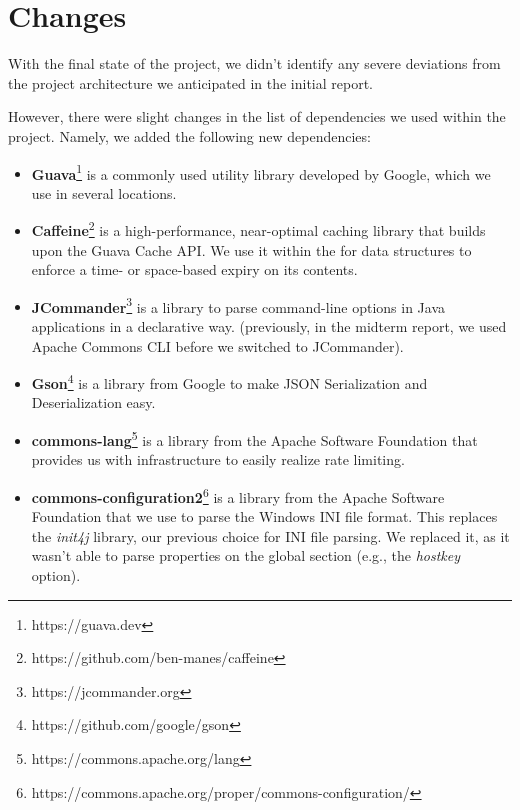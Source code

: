 \section{Changes}\label{sec:objective}

With the final state of the project, we didn't identify any severe deviations from the project architecture
we anticipated in the initial report.

However, there were slight changes in the list of dependencies we used within the project.
Namely, we added the following new dependencies:

\begin{itemize}
    \setlength\itemsep{0em}
    \item \textbf{Guava}\footnote{https://guava.dev} is a commonly used utility library developed by Google, which
    we use in several locations.
    \item \textbf{Caffeine}\footnote{https://github.com/ben-manes/caffeine} is a high-performance, near-optimal
    caching library that builds upon the Guava Cache API\@.
    We use it within the  for data structures to enforce a time- or
    space-based expiry on its contents.
    \item \textbf{JCommander}\footnote{https://jcommander.org} is a library to parse command-line options in Java applications
    in a declarative way.
    (previously, in the midterm report, we used Apache Commons CLI before we switched to JCommander).
    \item \textbf{Gson}\footnote{https://github.com/google/gson} is a library from Google to
    make JSON Serialization and Deserialization easy.
    \item \textbf{commons-lang}\footnote{https://commons.apache.org/lang} is a library from
    the Apache Software Foundation that provides us with infrastructure to easily realize
    rate limiting.
    \item \textbf{commons-configuration2}\footnote{https://commons.apache.org/proper/commons-configuration/} is
    a library from the Apache Software Foundation that we use to parse the Windows INI file format.
    This replaces the \textit{init4j} library, our previous choice for INI file parsing.
    We replaced it, as it wasn't able to parse properties on the global section (e.g., the \textit{hostkey} option).
\end{itemize}
